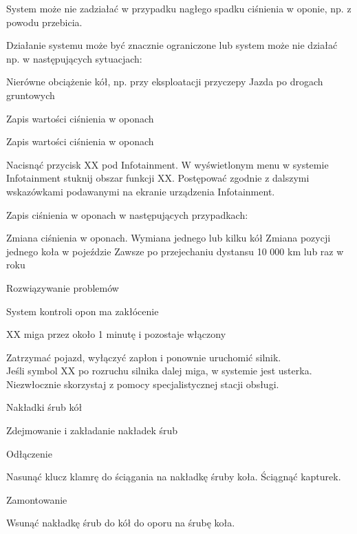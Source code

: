System może nie zadziałać w przypadku nagłego spadku ciśnienia w oponie, np. z powodu przebicia.

Działanie systemu może być znacznie ograniczone lub system może nie działać np. w następujących sytuacjach:
\begin{itemizeTriangle}
	\itemTriangle Nierówne obciążenie kół, np. przy eksploatacji przyczepy
	\itemTriangle Jazda po drogach gruntowych
\end{itemizeTriangle}

Zapis wartości ciśnienia w oponach

Zapis wartości ciśnienia w oponach
\begin{itemizeArrow}
	\itemArrow Nacisnąć przycisk XX pod Infotainment.
	\itemArrow W wyświetlonym menu w systemie Infotainment stuknij obszar funkcji XX.
	\itemArrow Postępować zgodnie z dalszymi wskazówkami podawanymi na ekranie urządzenia Infotainment.
\end{itemizeArrow}

Zapis ciśnienia w oponach w następujących przypadkach:
\begin{itemizeTriangle}
	\itemTriangle Zmiana ciśnienia w oponach.
	\itemTriangle Wymiana jednego lub kilku kół
	\itemTriangle Zmiana pozycji jednego koła w pojeździe
	\itemTriangle Zawsze po przejechaniu dystansu 10 000 km lub raz w roku
\end{itemizeTriangle}

Rozwiązywanie problemów

System kontroli opon ma zakłócenie

XX miga przez około 1 minutę i pozostaje włączony

\begin{itemizeArrow}
	\itemArrow Zatrzymać pojazd, wyłączyć zapłon i ponownie uruchomić silnik. \\ Jeśli symbol XX po rozruchu silnika dalej miga, w systemie jest usterka.
	\itemArrow Niezwłocznie skorzystaj z pomocy specjalistycznej stacji obsługi.
\end{itemizeArrow}

Nakładki śrub kół

Zdejmowanie i zakładanie nakładek śrub

Odłączenie
\begin{itemizeArrow}
	\itemArrow Nasunąć klucz klamrę do ściągania na nakładkę śruby koła.
	\itemArrow Ściągnąć kapturek.
\end{itemizeArrow}

Zamontowanie
\begin{itemizeArrow}
	\itemArrow Wsunąć nakładkę śrub do kół do oporu na śrubę koła.
\end{itemizeArrow}

